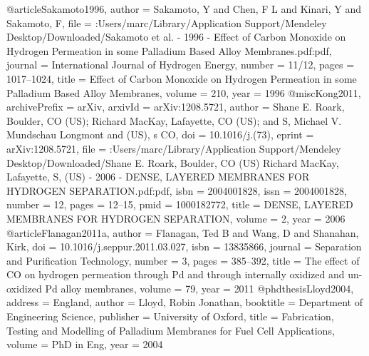 @article{Sakamoto1996,
author = {Sakamoto, Y and Chen, F L and Kinari, Y and Sakamoto, F},
file = {:Users/marc/Library/Application Support/Mendeley Desktop/Downloaded/Sakamoto et al. - 1996 - Effect of Carbon Monoxide on Hydrogen Permeation in some Palladium Based Alloy Membranes.pdf:pdf},
journal = {International Journal of Hydrogen Energy},
number = {11/12},
pages = {1017--1024},
title = {{Effect of Carbon Monoxide on Hydrogen Permeation in some Palladium Based Alloy Membranes}},
volume = {210},
year = {1996}
}
@misc{Kong2011,
archivePrefix = {arXiv},
arxivId = {arXiv:1208.5721},
author = {{Shane E. Roark, Boulder, CO (US); Richard MacKay, Lafayette}, CO (US); and S, Michael V. Mundschau Longmont and (US), s CO},
doi = {10.1016/j.(73)},
eprint = {arXiv:1208.5721},
file = {:Users/marc/Library/Application Support/Mendeley Desktop/Downloaded/Shane E. Roark, Boulder, CO (US) Richard MacKay, Lafayette, S, (US) - 2006 - DENSE, LAYERED MEMBRANES FOR HYDROGEN SEPARATION.pdf:pdf},
isbn = {2004001828},
issn = {2004001828},
number = {12},
pages = {12--15},
pmid = {1000182772},
title = {{DENSE, LAYERED MEMBRANES FOR HYDROGEN SEPARATION}},
volume = {2},
year = {2006}
}
@article{Flanagan2011a,
author = {Flanagan, Ted B and Wang, D and Shanahan, Kirk},
doi = {10.1016/j.seppur.2011.03.027},
isbn = {13835866},
journal = {Separation and Purification Technology},
number = {3},
pages = {385--392},
title = {{The effect of CO on hydrogen permeation through Pd and through internally oxidized and un-oxidized Pd alloy membranes}},
volume = {79},
year = {2011}
}
@phdthesis{Lloyd2004,
address = {England},
author = {Lloyd, Robin Jonathan},
booktitle = {Department of Engineering Science},
publisher = {University of Oxford},
title = {{Fabrication, Testing and Modelling of Palladium Membranes for Fuel Cell Applications}},
volume = {PhD in Eng},
year = {2004}
}
